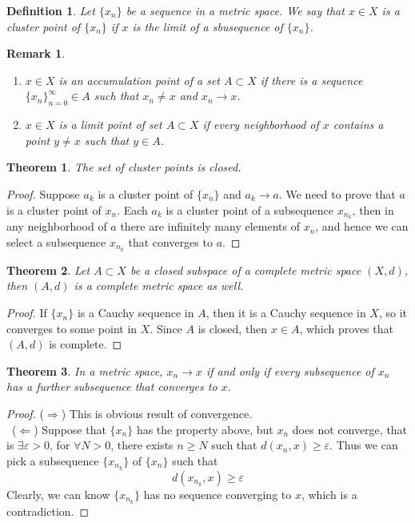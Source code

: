\documentclass[12pt,leqno]{amsart}
\newtheorem{definition}{Definition}[section]
\newtheorem{theorem}{Theorem}[section]
\newtheorem{remark}{Remark}[section]
\theoremstyle{definition}
\numberwithin{equation}{subsection}
\begin{document}
\begin{definition}
Let $\{x_n\}$ be a sequence in a metric space. We say that $x\in X$ is a cluster point of $\{x_n\}$ if $x$ is the limit of a sbusequence of $\{x_n\}$.
\end{definition}
\begin{remark}
$ $
\begin{enumerate}
  \item $x\in X$ is an accumulation point of a set $A\subset X$ if there is a sequence $\{x_n\}^\infty_{n=0}\in A$ such that $x_n\neq x$ and $x_n \rightarrow x$.
  \item $x\in X$ is a limit point of set $A\subset X$ if every neighborhood of $x$ contains a point $y\neq x$ such that $y\in A$.
\end{enumerate}
\end{remark}

\medskip

\begin{theorem}
The set of cluster points is closed.
\end{theorem}
\begin{proof}
Suppose $a_k$ is a cluster point of $\{x_n\}$ and $a_k\to a$. We need to prove that $a$ is a cluster point of $x_n$. Each $a_k$ is a cluster point of a subsequence $x_{n_k}$, then in any neighborhood of $a$ there are infinitely many elements of $x_n$, and hence we can select a subsequence $x_{n_k}$ that converges to $a$.
\end{proof}

\begin{theorem}
Let $A\subset X$ be a closed subspace of a complete metric space $(X,d)$, then $(A,d)$ is a complete metric space as well.
\end{theorem}
\begin{proof}
If $\{x_n\}$ is a Cauchy sequence in $A$, then it is a Cauchy sequence in $X$, so it converges to some point in $X$. Since $A$ is closed, then $x\in A$, which proves that $(A,d)$ is complete.
\end{proof}

\begin{theorem}
In a metric space, $x_n\to x$ if and only if every subsequence of $x_n$ has a further subsequence that converges to $x$. 
\end{theorem}
\begin{proof}
($\Rightarrow$) This is obvious result of convergence. \\
\hspace*{1em}\, ($\Leftarrow$) Suppose that $\{x_n\}$ has the property above, but $x_n$ does not converge, that is $\exists \varepsilon > 0$, for $\forall N > 0$, there exists $n \geq N$ such that $d(x_n,x)\geq\varepsilon$. Thus we can pick a subsequence $\{x_{n_k}\}$ of $\{x_n\}$ such that
$$d(x_{n_k},x)\geq\varepsilon$$
Clearly, we can know $\{x_{n_k}\}$ has no sequence converging to $x$, which is a contradiction.
\end{proof}
\end{document}
